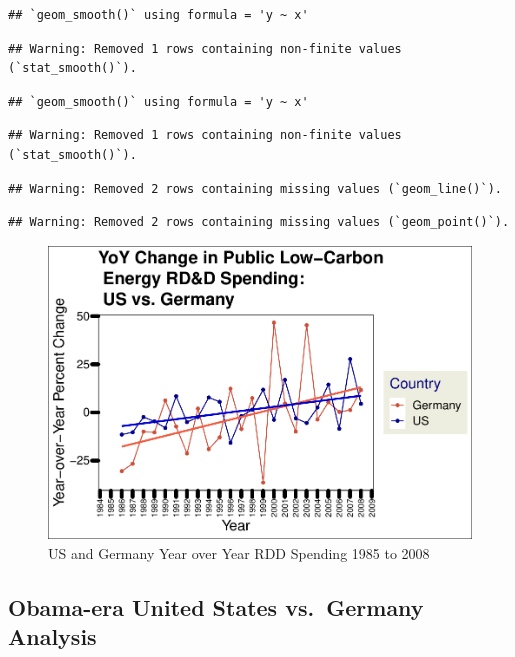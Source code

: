 \documentclass[
  12pt,
]{article}
\begin{document}
\begin{verbatim}
## `geom_smooth()` using formula = 'y ~ x'
\end{verbatim}

\begin{verbatim}
## Warning: Removed 1 rows containing non-finite values (`stat_smooth()`).
\end{verbatim}

\begin{verbatim}
## `geom_smooth()` using formula = 'y ~ x'
\end{verbatim}

\begin{verbatim}
## Warning: Removed 1 rows containing non-finite values (`stat_smooth()`).
\end{verbatim}

\begin{verbatim}
## Warning: Removed 2 rows containing missing values (`geom_line()`).
\end{verbatim}

\begin{verbatim}
## Warning: Removed 2 rows containing missing values (`geom_point()`).
\end{verbatim}

\begin{figure}
\centering
\includegraphics{Chang_Jenkins_Mullens_ENV872_Final_files/figure-latex/visualizing the pre US and Germany data together-1.pdf}
\caption{US and Germany Year over Year RDD Spending 1985 to 2008}
\end{figure}

\hypertarget{obama-era-united-states-vs.-germany-analysis}{%
\subsection{Obama-era United States vs.~Germany
Analysis}\label{obama-era-united-states-vs.-germany-analysis}}
\end{document}
